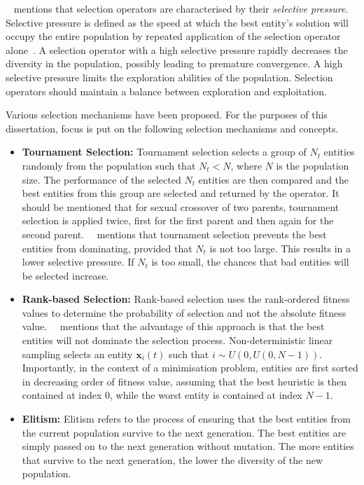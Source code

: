\citeauthor{ref:engelbrecht:2007}~\cite{ref:engelbrecht:2007} mentions that selection operators are characterised by their \textit{selective pressure}. Selective pressure is defined as the speed at which the best entity's solution will occupy the entire population by repeated application of the selection operator alone~\cite{ref:back:1994}. A selection operator with a high selective pressure rapidly decreases the diversity in the population, possibly leading to premature convergence. A high selective pressure limits the exploration abilities of the population. Selection operators should maintain a balance between exploration and exploitation.

Various selection mechanisms have been proposed. For the purposes of this dissertation, focus is put on the following selection mechanisms and concepts.

\begin{itemize}
	\item \textbf{Tournament Selection:} Tournament selection selects a group of $N_{t}$ entities randomly from the population such that $N_{t} < N$, where $N$ is the population size. The performance of the selected $N_{t}$ entities are then compared and the best entities from this group are selected and returned by the operator. It should be mentioned that for sexual crossover of two parents, tournament selection is applied twice, first for the first parent and then again for the second parent.~\citeauthor{ref:engelbrecht:2007}~\cite{ref:engelbrecht:2007} mentions that tournament selection prevents the best entities from dominating, provided that $N_{t}$ is not too large. This results in a lower selective pressure. If $N_{t}$ is too small, the chances that bad entities will be selected increase.

	\item \textbf{Rank-based Selection:} Rank-based selection uses the rank-ordered fitness values to determine the probability of selection and not the absolute fitness value.~\citeauthor{ref:engelbrecht:2007}~\cite{ref:engelbrecht:2007} mentions that the advantage of this approach is that the best entities will not dominate the selection process. Non-deterministic linear sampling selects an entity $\boldsymbol{x}_{i}(t)$ such that $i \sim U(0, U(0, N - 1))$. Importantly, in the context of a minimisation problem, entities are first sorted in decreasing order of fitness value, assuming that the best heuristic is then contained at index 0, while the worst entity is contained at index $N - 1$.

	\item \textbf{Elitism:} Elitism refers to the process of ensuring that the best entities from the current population survive to the next generation. The best entities are simply passed on to the next generation without mutation. The more entities that survive to the next generation, the lower the diversity of the new population.
\end{itemize}


